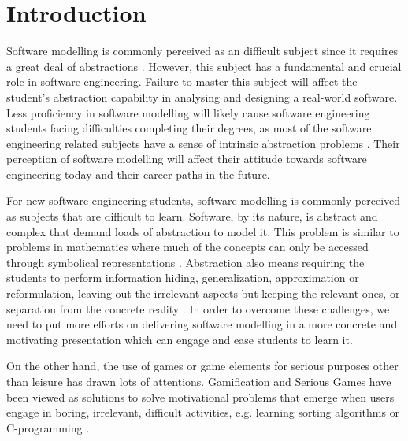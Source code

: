 \documentclass[runningheads,a4paper]{llncs}
\begin{document}
\section{Introduction}
Software modelling is commonly perceived as an difficult subject since it requires a great deal of abstractions \cite{Borstler2012}. However, this subject has a fundamental and crucial role in software engineering. Failure to master this subject will affect the student’s abstraction capability in analysing and designing a real-world software. Less proficiency in software modelling will likely cause software engineering students facing difficulties completing their degrees, as most of the software engineering related subjects have a sense of intrinsic abstraction problems \cite{Kramer2007}. Their perception of software modelling will affect their attitude towards software engineering today and their career paths in the future.

For new software engineering students, software modelling is commonly perceived as subjects that are difficult to learn. Software, by its nature, is abstract and complex that demand loads of abstraction to model it. This problem is similar to problems in mathematics where much of the concepts can only be accessed through symbolical representations \cite{Duval2006}. Abstraction also means requiring the students to perform information hiding, generalization, approximation or reformulation, leaving out the irrelevant aspects but keeping the relevant ones, or separation from the concrete reality \cite{Saitta2013}. In order to overcome these challenges, we need to put more efforts on delivering software modelling in a more concrete and motivating presentation which can engage and ease students to learn it.

On the other hand, the use of games or game elements for serious purposes other than leisure has drawn lots of attentions. Gamification \cite{deterding2011game} and Serious Games \cite{Michael2005} have been viewed as solutions to solve motivational problems that emerge when users engage in  boring, irrelevant, difficult activities, e.g. learning sorting algorithms \cite{Yohannis2015} or C-programming \cite{Ibanez2014}.
\end{document}
